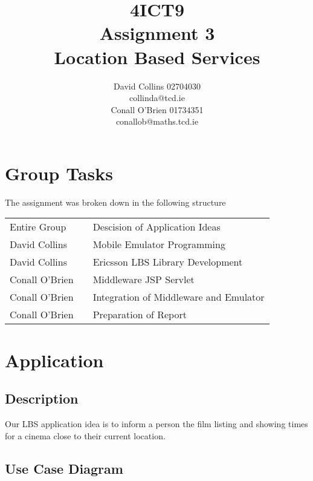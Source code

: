 \documentclass[a4paper,12pt]{article}
\begin{document}
\title{4ICT9 \\ Assignment 3 \\ Location Based Services}

\author{David Collins 02704030 \\ collinda@tcd.ie \\ 
Conall O'Brien 01734351 \\ conallob@maths.tcd.ie}

\maketitle

\section{Group Tasks}

The assignment was broken down in the following structure

\begin{tabular}{lcl}
Entire Group &	\hspace{15mm}	&	Descision of Application Ideas	\\
David Collins	&					&	Mobile Emulator Programming			\\
David Collins	&					&	Ericsson LBS Library Development \\
Conall O'Brien	&					&	Middleware JSP Servlet \\
Conall O'Brien	&					&	Integration	of Middleware and Emulator \\
Conall O'Brien	&					&	Preparation of Report					\\
\end{tabular}

\section{Application}

\subsection{Description}

Our LBS application idea is to inform a person the film listing and 
showing times for a cinema close to their current location.

\subsection{Use Case Diagram}
\end{document}
